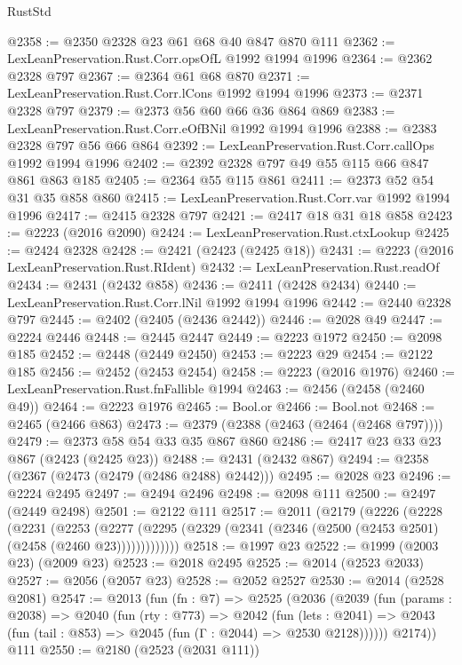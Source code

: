 \begin{lexlean}{RustStd}
\begin{coremodule}
@2358 := @2350 @2328 @23 @61 @68 @40 @847 @870 @111
@2362 := LexLeanPreservation.Rust.Corr.opsOfL @1992 @1994 @1996
@2364 := @2362 @2328 @797
@2367 := @2364 @61 @68 @870
@2371 := LexLeanPreservation.Rust.Corr.lCons @1992 @1994 @1996
@2373 := @2371 @2328 @797
@2379 := @2373 @56 @60 @66 @36 @864 @869
@2383 := LexLeanPreservation.Rust.Corr.eOfBNil @1992 @1994 @1996
@2388 := @2383 @2328 @797 @56 @66 @864
@2392 := LexLeanPreservation.Rust.Corr.callOps @1992 @1994 @1996
@2402 := @2392 @2328 @797 @49 @55 @115 @66 @847 @861 @863 @185
@2405 := @2364 @55 @115 @861
@2411 := @2373 @52 @54 @31 @35 @858 @860
@2415 := LexLeanPreservation.Rust.Corr.var @1992 @1994 @1996
@2417 := @2415 @2328 @797
@2421 := @2417 @18 @31 @18 @858
@2423 := @2223 (@2016 @2090)
@2424 := LexLeanPreservation.Rust.ctxLookup
@2425 := @2424 @2328
@2428 := @2421 (@2423 (@2425 @18))
@2431 := @2223 (@2016 LexLeanPreservation.Rust.RIdent)
@2432 := LexLeanPreservation.Rust.readOf
@2434 := @2431 (@2432 @858)
@2436 := @2411 (@2428 @2434)
@2440 := LexLeanPreservation.Rust.Corr.lNil @1992 @1994 @1996
@2442 := @2440 @2328 @797
@2445 := @2402 (@2405 (@2436 @2442))
@2446 := @2028 @49
@2447 := @2224 @2446
@2448 := @2445 @2447
@2449 := @2223 @1972
@2450 := @2098 @185
@2452 := @2448 (@2449 @2450)
@2453 := @2223 @29
@2454 := @2122 @185
@2456 := @2452 (@2453 @2454)
@2458 := @2223 (@2016 @1976)
@2460 := LexLeanPreservation.Rust.fnFallible @1994
@2463 := @2456 (@2458 (@2460 @49))
@2464 := @2223 @1976
@2465 := Bool.or
@2466 := Bool.not
@2468 := @2465 (@2466 @863)
@2473 := @2379 (@2388 (@2463 (@2464 (@2468 @797))))
@2479 := @2373 @58 @54 @33 @35 @867 @860
@2486 := @2417 @23 @33 @23 @867 (@2423 (@2425 @23))
@2488 := @2431 (@2432 @867)
@2494 := @2358 (@2367 (@2473 (@2479 (@2486 @2488) @2442)))
@2495 := @2028 @23
@2496 := @2224 @2495
@2497 := @2494 @2496
@2498 := @2098 @111
@2500 := @2497 (@2449 @2498)
@2501 := @2122 @111
@2517 := @2011
    (@2179
      (@2226
        (@2228
          (@2231
            (@2253
              (@2277 (@2295 (@2329 (@2341 (@2346 (@2500 (@2453 @2501) (@2458 (@2460 @23)))))))))))))
@2518 := @1997 @23
@2522 := @1999 (@2003 @23) (@2009 @23)
@2523 := @2018 @2495
@2525 := @2014 (@2523 @2033)
@2527 := @2056 (@2057 @23)
@2528 := @2052 @2527
@2530 := @2014 (@2528 @2081)
@2547 := @2013
    (fun (fn : @7) =>
    @2525
      (@2036
        (@2039
          (fun (params : @2038) =>
          @2040
            (fun (rty : @773) =>
            @2042
              (fun (lets : @2041) =>
              @2043 (fun (tail : @853) => @2045 (fun (Γ : @2044) => @2530 @2128))))))
        @2174))
    @111
@2550 := @2180 (@2523 (@2031 @111))

\end{coremodule}
\end{lexlean}
